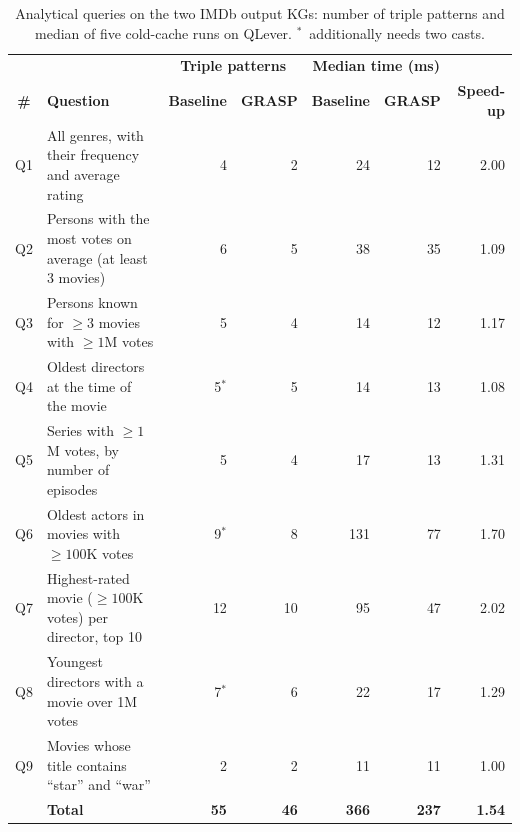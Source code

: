 \begin{table}[!htbp]
  \centering
  \small
  \renewcommand{\arraystretch}{1.3}
  \setlength{\tabcolsep}{4pt}
  \begin{tabular}{c >{\raggedright\arraybackslash}p{5.75cm} r r r r r}
    \hline
    & & \multicolumn{2}{c}{\textbf{Triple patterns}} & \multicolumn{2}{c}{\textbf{Median time (ms)}} & \\
    \textbf{\#} & \textbf{Question} & \textbf{Baseline} & \textbf{GRASP} & \textbf{Baseline} & \textbf{GRASP} & \textbf{Speed-up} \\
    \hline
    Q1 & All genres, with their frequency and average rating        & 4  & 2  & 24  & 12  & 2.00 \\
    Q2 & Persons with the most votes on average (at least 3 movies) & 6  & 5  & 38  & 35  & 1.09 \\
    Q3 & Persons known for \(\geq 3\) movies with \(\geq 1\)M votes  & 5  & 4  & 14  & 12  & 1.17 \\
    Q4 & Oldest directors at the time of the movie                  & 5\(^{*}\) & 5  & 14  & 13  & 1.08 \\
    Q5 & Series with \(\geq 1\)M votes, by number of episodes        & 5  & 4  & 17  & 13  & 1.31 \\
    Q6 & Oldest actors in movies with \(\geq 100\)K votes          & 9\(^{*}\) & 8  & 131 & 77  & 1.70 \\
    Q7 & Highest-rated movie (\(\geq 100\)K votes) per director, top 10 & 12 & 10 & 95 & 47 & 2.02 \\
    Q8 & Youngest directors with a movie over 1M votes              & 7\(^{*}\) & 6  & 22  & 17  & 1.29 \\
    Q9 & Movies whose title contains ``star'' and ``war''           & 2  & 2  & 11  & 11  & 1.00 \\
    \hline
       & \textbf{Total}                                              & \textbf{55} & \textbf{46} & \textbf{366} & \textbf{237} & \textbf{1.54} \\
    \hline
  \end{tabular}
  \caption[Analytical queries on the IMDb output KGs]{Analytical queries on the two IMDb output KGs: number of triple patterns and median of five cold-cache runs on QLever. \(^{*}\)~additionally needs two casts.}
  \label{tab:imdb-queries}
\end{table}

